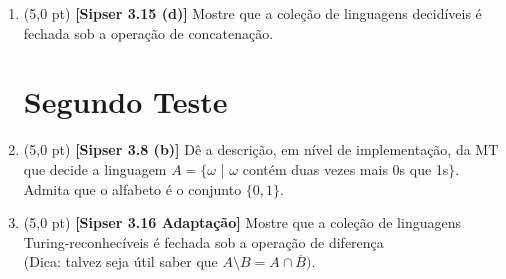 \documentclass[12pt,a4paper,oneside]{article}
\begin{document}
\begin{enumerate}
	\item (5,0 pt) {\bf [Sipser 3.15 (d)]} Mostre que a coleção de linguagens decidíveis é fechada sob a operação de concatenação.
	
	\section*{Segundo Teste}
	
	\item (5,0 pt)  {\bf [Sipser 3.8 (b)]} Dê a descrição, em nível de implementação, da MT que decide a linguagem $A = \{\omega$ | $\omega$ contém duas vezes mais 0s que 1s$\}$. Admita que o alfabeto é o conjunto $\{0,1\}$.

	\item (5,0 pt) {\bf [Sipser 3.16 Adaptação]} Mostre que a coleção de linguagens Turing-reconhecíveis é fechada sob a operação de diferença \\(Dica: talvez seja útil saber que $A \setminus B = A \cap \overline{B})$.
	
	

\end{enumerate}
\end{document}
